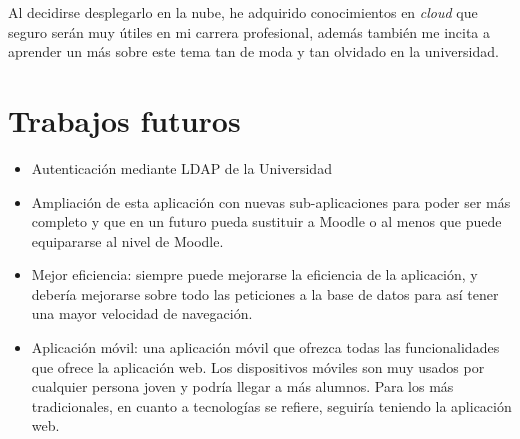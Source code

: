 Al decidirse desplegarlo en la nube, he adquirido conocimientos en \textit{cloud} que seguro serán muy útiles en mi carrera profesional, además también me incita a aprender un más sobre este tema tan de moda y tan olvidado en la universidad. 



\section{Trabajos futuros} 
\label{sec:futuro}


\begin{itemize}
\item Autenticación mediante LDAP de la Universidad
\item Ampliación de esta aplicación con nuevas sub-aplicaciones para poder ser más completo y que en un futuro pueda sustituir a Moodle o al menos que puede equipararse al nivel de Moodle.
\item Mejor eficiencia: siempre puede mejorarse la eficiencia de la aplicación, y debería mejorarse sobre todo las peticiones a la base de datos para así tener una mayor velocidad de navegación. 
\item Aplicación móvil: una aplicación móvil que ofrezca todas las funcionalidades que ofrece la aplicación web. Los dispositivos móviles son muy usados por cualquier persona joven y podría llegar a más alumnos. Para los más tradicionales, en cuanto a tecnologías se refiere, seguiría teniendo la aplicación web.
\end{itemize}
